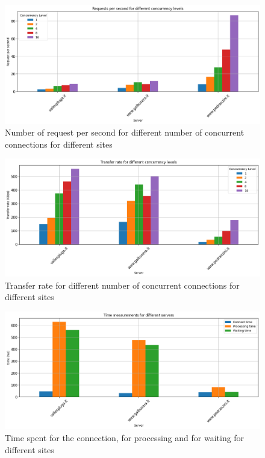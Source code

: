 \documentclass[eng]{class}
\begin{document}
\begin{figure}[H]
  \centering
  \includegraphics[width=\columnwidth]{images/Request_per_second_diff_conc.png}
  \caption{Number of request per second for different number of concurrent connections for different sites}
  \label{fig-3}
\end{figure}
\begin{figure}[H]
  \centering
  \includegraphics[width=\columnwidth]{images/transf_diff_conc.png}
  \caption{Transfer rate for different number of concurrent connections for different sites}
  \label{fig-4}
\end{figure}

\begin{figure}[H]
  \centering
  \includegraphics[width=\columnwidth]{images/time_diff_server.png}
  \caption{Time spent for the connection, for processing and for waiting for different sites}
  \label{fig-5}
\end{figure}
\end{document}
